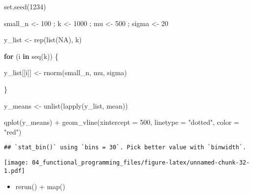 \documentclass[
]{book}
\newenvironment{Shaded}{\begin{snugshade}}{\end{snugshade}}
\newcommand{\AttributeTok}[1]{\textcolor[rgb]{0.77,0.63,0.00}{#1}}
\newcommand{\ConstantTok}[1]{\textcolor[rgb]{0.00,0.00,0.00}{#1}}
\newcommand{\ControlFlowTok}[1]{\textcolor[rgb]{0.13,0.29,0.53}{\textbf{#1}}}
\newcommand{\DecValTok}[1]{\textcolor[rgb]{0.00,0.00,0.81}{#1}}
\newcommand{\FunctionTok}[1]{\textcolor[rgb]{0.00,0.00,0.00}{#1}}
\newcommand{\NormalTok}[1]{#1}
\newcommand{\OtherTok}[1]{\textcolor[rgb]{0.56,0.35,0.01}{#1}}
\newcommand{\SpecialCharTok}[1]{\textcolor[rgb]{0.00,0.00,0.00}{#1}}
\newcommand{\StringTok}[1]{\textcolor[rgb]{0.31,0.60,0.02}{#1}}
\providecommand{\tightlist}{%
  \setlength{\itemsep}{0pt}\setlength{\parskip}{0pt}}
\begin{document}
\begin{Shaded}
\begin{Highlighting}[]
\FunctionTok{set.seed}\NormalTok{(}\DecValTok{1234}\NormalTok{)}

\NormalTok{small\_n }\OtherTok{\textless{}{-}} \DecValTok{100}\NormalTok{ ; k }\OtherTok{\textless{}{-}} \DecValTok{1000}\NormalTok{ ; mu }\OtherTok{\textless{}{-}} \DecValTok{500}\NormalTok{ ; sigma }\OtherTok{\textless{}{-}} \DecValTok{20} 

\NormalTok{y\_list }\OtherTok{\textless{}{-}} \FunctionTok{rep}\NormalTok{(}\FunctionTok{list}\NormalTok{(}\ConstantTok{NA}\NormalTok{), k)}

\ControlFlowTok{for}\NormalTok{ (i }\ControlFlowTok{in} \FunctionTok{seq}\NormalTok{(k)) \{}
        
\NormalTok{    y\_list[[i]] }\OtherTok{\textless{}{-}} \FunctionTok{rnorm}\NormalTok{(small\_n, mu, sigma)}
        
\NormalTok{\}}

\NormalTok{y\_means }\OtherTok{\textless{}{-}} \FunctionTok{unlist}\NormalTok{(}\FunctionTok{lapply}\NormalTok{(y\_list, mean))}

\FunctionTok{qplot}\NormalTok{(y\_means) }\SpecialCharTok{+}
   \FunctionTok{geom\_vline}\NormalTok{(}\AttributeTok{xintercept =} \DecValTok{500}\NormalTok{, }\AttributeTok{linetype =} \StringTok{"dotted"}\NormalTok{, }\AttributeTok{color =} \StringTok{"red"}\NormalTok{)}
\end{Highlighting}
\end{Shaded}

\begin{verbatim}
## `stat_bin()` using `bins = 30`. Pick better value with `binwidth`.
\end{verbatim}

\texttt{[image: 04\_functional\_programming\_files/figure-latex/unnamed-chunk-32-1.pdf]}

\begin{itemize}
\tightlist
\item
  rerun() + map()
\end{itemize}
\end{document}
